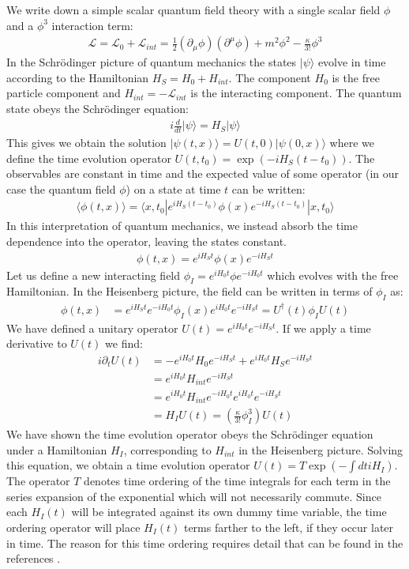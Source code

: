 We write down a simple scalar quantum field theory with a single scalar field $\phi$ and a $\phi^3$ interaction term:
\begin{align*}
\mathcal{L} = \mathcal{L}_0 + \mathcal{L}_{int} = \frac{1}{2}(\partial_\mu \phi) (\partial^\mu \phi) + m^2 \phi^2 - \frac{\kappa}{3!} \phi^3 
\end{align*}
In the Schr\"odinger picture of quantum mechanics the states $|\psi \rangle$  evolve in time 
according to the Hamiltonian $H_S=H_0+H_{int}.$  The component $H_0$ is the free particle component and $H_{int} = - \mathcal{L}_{int}$ is the interacting component. The quantum state obeys the Schr\"odinger equation:
\begin{align*}
i\frac{d}{dt} |\psi \rangle = H_S | \psi \rangle
\end{align*}
This gives we obtain the solution $|\psi(t,x) \rangle =  U(t,0)| \psi(0,x) \rangle$ where we define
the time evolution operator $U(t,t_0) = \exp{(-iH_S (t-t_0))}$.  The observables are constant in time
and the expected value of some operator (in our case the quantum field $\phi$) on a state
at time $t$ can be written:
\begin{align*}
\langle \phi(t,x) \rangle = \langle x,t_0 | e^{iH_S(t-t_0)} \phi(x) e^{-iH_S(t-t_0)} | x,t_0 \rangle 
\end{align*}
In this interpretation of quantum mechanics, we instead absorb the time dependence into the operator, leaving the states constant.
\begin{align*}
 \phi(t,x) =   e^{iH_St} \phi(x)  e^{-iH_St}
\end{align*}
Let us define a new interacting field $\phi_I = e^{iH_0t} \phi  e^{-iH_0t}$ which evolves
 with the free Hamiltonian. In the Heisenberg picture, the field can be written in terms of $\phi_I$ as:
\begin{align*}
 \phi(t,x) &=   e^{iH_St}e^{-iH_0t} \phi_I(x) e^{iH_0t} e^{-iH_St} = U^\dagger(t) \phi_I U(t)
\end{align*}
We have defined a unitary operator $U(t)=e^{iH_0t}e^{-iH_St}$. If we apply a time derivative to $U(t)$ we find:
\begin{align*}
i\partial_t U(t) &= -e^{iH_0t}H_0 e^{-iH_St} + e^{iH_0t} H_S e^{-iH_St}\\
&= e^{iH_0t}H_{int}e^{-iH_St}\\
&= e^{iH_0t}H_{int}e^{-iH_0t}e^{iH_0t}e^{-iH_St}\\
&= H_I U(t) = \left (\frac{\kappa}{3!}\phi_I^3 \right) U(t)
\end{align*}
We have shown the time evolution operator obeys the Schr\"odinger equation under a Hamiltonian $H_{I}$, corresponding to
 $H_{int}$ in the Heisenberg picture. Solving this equation, we obtain a time evolution
operator $U(t) = T\exp (-\int dt iH_I)$. The operator $T$ denotes time ordering of the time integrals for each term
in the series expansion of the exponential which will not necessarily commute. 
 Since each $H_I(t)$ will be integrated against its own dummy time variable, the time ordering operator will place $H_I(t)$ terms farther to the left,
 if they occur later in time. The reason for this time ordering requires detail that can be found in the references \cite{peskin,Srednicki}.

